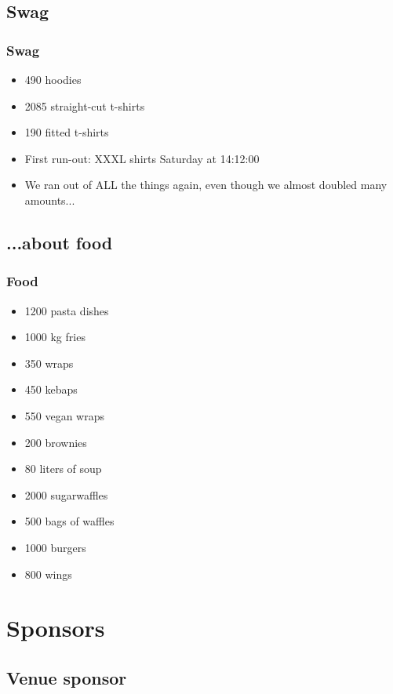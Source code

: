 \documentclass[aspectratio=169]{beamer}
\begin{document}
\subsection{Swag}

\begin{frame}
	\frametitle{Swag}
	\vfill
	\begin{itemize}
		\item 490 hoodies
		\item 2085 straight-cut t-shirts
		\item 190 fitted t-shirts
		\item First run-out: XXXL shirts Saturday at 14:12:00
		\item We ran out of ALL the things again, even though we almost doubled many amounts...
	\end{itemize}
	\vfill
\end{frame}

\subsection{...about food}

\begin{frame}
	\frametitle{Food}
	\vfill
	\begin{itemize}
		\item 1200 pasta dishes
		\item 1000 kg fries
		\item 350 wraps
		\item 450 kebaps
		\item 550 vegan wraps
		\item 200 brownies
		\item 80 liters of soup
		\item 2000 sugarwaffles
		\item 500 bags of waffles
		\item 1000 burgers
		\item 800 wings
	\end{itemize}
	\vfill
\end{frame}

\section{Sponsors}


\subsection{Venue sponsor}
\end{document}
